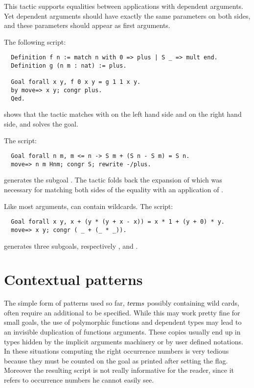 This tactic supports equalities between applications with dependent
arguments. Yet dependent arguments should have exactly the same
parameters on both sides, and these parameters should appear as first
arguments.

The following script:
\begin{lstlisting}
  Definition f n := match n with 0 => plus | S _ => mult end.
  Definition g (n m : nat) := plus.

  Goal forall x y, f 0 x y = g 1 1 x y.
  by move=> x y; congr plus.
  Qed.
\end{lstlisting}
shows that the  tactic matches  with  on the
left hand side and  on the right hand side, and solves the goal.

The script:
\begin{lstlisting}
  Goal forall n m, m <= n -> S m + (S n - S m) = S n.
  move=> n m Hnm; congr S; rewrite -/plus.
\end{lstlisting}
generates the subgoal . The tactic
 folds back the expansion of  which was
necessary for matching both sides of the equality with an application
of .

Like most \ssr{} arguments, {\term} can contain wildcards.
The script:
\begin{lstlisting}
  Goal forall x y, x + (y * (y + x - x)) = x * 1 + (y + 0) * y.
  move=> x y; congr ( _ + (_ * _)).
\end{lstlisting}
generates three subgoals, respectively , 
and .
\section{Contextual patterns}
\label{ssec:rewp}

The simple form of patterns used so far, ${\textrm{\textsl{term}}}s$ possibly containing
wild cards, often require an additional  to be specified.
While this may work pretty fine for small goals, the use of polymorphic
functions and dependent types may lead to an invisible duplication of functions
arguments. These copies usually end up in types hidden by the implicit
arguments machinery or by user defined notations.  In these situations
computing the right occurrence numbers is very tedious because they must be
counted on the goal as printed after setting the  flag.
Moreover the resulting script is not really informative for the reader, since
it refers to occurrence numbers he cannot easily see.

